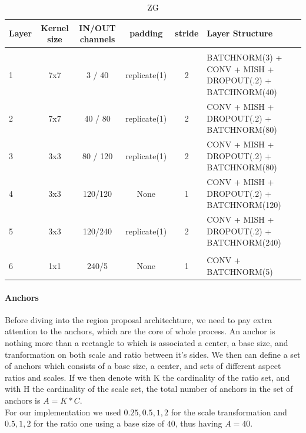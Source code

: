 \documentclass[10pt,journal,cspaper,compsoc]{IEEEtran}
\begin{document}
    \begin{table}[htb]
        \centering
        \caption{ZG}
        \label{tab:Table 1}
        \begin{tabularx}{.9\paperwidth}{l | c | c | c | c |  l}  
            \textbf{Layer} & \textbf{Kernel size} & \textbf{IN/OUT channels} & \textbf{padding} & \textbf{stride} & \textbf{Layer Structure}\\
            \hline 
            & & & & & \\
            1 & 7x7 & 3 / 40 & replicate(1) & 2 & BATCHNORM(3) + CONV + MISH + DROPOUT(.2) + BATCHNORM(40) \\
            2 & 7x7 & 40 / 80 & replicate(1) & 2 & CONV + MISH + DROPOUT(.2) + BATCHNORM(80) \\
            3 & 3x3 & 80 / 120 & replicate(1) & 2 & CONV + MISH + DROPOUT(.2) + BATCHNORM(80) \\ 
            4 & 3x3 & 120/120 & None & 1 & CONV + MISH + DROPOUT(.2) + BATCHNORM(120)  \\
            5 & 3x3 & 120/240 & replicate(1) & 2 & CONV + MISH + DROPOUT(.2) + BATCHNORM(240) \\
            \hline
            & & & & & \\
            6 & 1x1 & 240/5 & None & 1 & CONV + BATCHNORM(5)
        \end{tabularx}
    \end{table}
    
   \paragraph{Anchors}
    Before diving into the region proposal architechture, we need to pay extra attention to the anchors, which are the core of whole process. An anchor is nothing more than a rectangle to which is associated a center, a base size, and tranformation on both scale and ratio between it's sides. We then can define a set of anchors which consists of a base size, a center, and sets of different 
   aspect ratios and scales. If we then denote with K the cardinality of the ratio set, and with H the cardinality of the scale set, the total number of anchors in the set of anchors is $A = K * C$. \\
   For our implementation we used ${0.25, 0.5, 1, 2}$ for the scale transformation and ${0.5, 1, 2}$ for the ratio one using a base size of $40$, thus having $A = 40$. 
    
\end{document}
